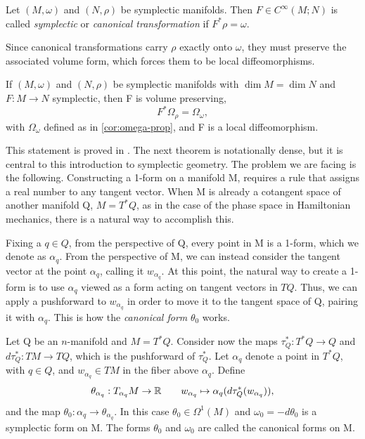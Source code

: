 \begin{definition}\label{def:canonical-transformation}
	Let $(M,\omega)$ and $(N,\rho)$ be symplectic manifolds. Then $F \in C^\infty(M;N)$ is called \emph{symplectic} or \emph{canonical transformation} if $F^*\rho = \omega$.
\end{definition}

\noindent Since canonical transformations carry $\rho$ exactly onto $\omega$, they must preserve the associated volume form, which forces them to be local diffeomorphisms.

\begin{proposition}
	If $(M,\omega)$ and $(N,\rho)$ be symplectic manifolds with $\dim M = \dim N$ and $F:M \to N$ symplectic, then F is volume preserving, $$F^*\Omega_\rho=\Omega_\omega,$$ with $\Omega_\omega$ defined as in \ref{cor:omega-prop}, and F is a local diffeomorphism.
\end{proposition}

This statement is proved in \cite[Proposition 3.2.6]{abrahamFoundationsMechanics2008}. The next theorem is notationally dense, but it is central to this introduction to symplectic geometry. The problem we are facing is the following. Constructing a 1-form on a manifold M, requires a rule that assigns a real number to any tangent vector. When M is already a cotangent space of another manifold Q, $M = T^*Q$, as in the case of the phase space in Hamiltonian mechanics, there is a natural way to accomplish this.

\medskip 
Fixing a $q \in Q$, from the perspective of Q, every point in M is a 1-form, which we denote as $\alpha_q$. From the perspective of M, we can instead consider the tangent vector at the point $\alpha_q$, calling it $w_{\alpha_q}$. 
At this point, the natural way to create a 1-form is to use $\alpha_q$ viewed as a form acting on tangent vectors in $TQ$. Thus, we can apply a pushforward to $w_{\alpha_q}$ in order to move it to the tangent space of Q, pairing it with $\alpha_q$. This is how the \textit{canonical form} $\theta_0$ works.

\begin{theorem}\label{thm:canon}
	Let Q be an $n$-manifold and $M = T^*Q$. Consider now the maps $\tau^*_Q: T^*Q \to Q$ and $d\tau^*_Q: TM \to TQ$, which is the pushforward of $\tau^*_Q$. Let $\alpha_q$ denote a point in $T^*Q$, with $q \in Q$, and $w_{\alpha_q} \in TM$ in the fiber above $\alpha_q$. Define
	\[
		\theta_{\alpha_q} : T_{\alpha_q}M \to \mathbb{R} \qquad w_{\alpha_q} \mapsto \alpha_q(d \tau^*_Q(w_{\alpha_q})),
	\] 
	and the map $\theta_0: \alpha_q \to \theta_{\alpha_q}$. In this case $\theta_0 \in \Omega^1(M)$ and $\omega_0=-d\theta_0$ is a symplectic form on M. The forms $\theta_0$ and $\omega_0$ are called the canonical forms on M.
\end{theorem}

